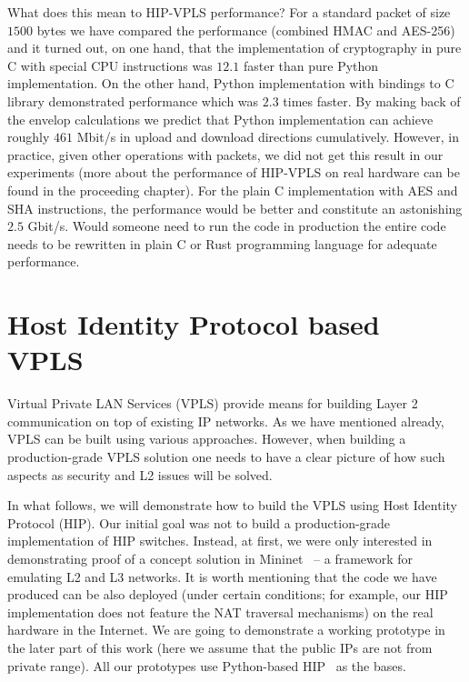What does this mean to HIP-VPLS performance? For a standard packet of size $1500$ 
bytes we have compared the performance (combined HMAC and AES-256) and it turned 
out, on one hand, that the implementation of cryptography in pure C with special CPU instructions was 
$12.1$ faster than pure Python implementation. On the other hand, Python implementation with bindings
to C library demonstrated performance which was $2.3$ times faster. By making back of the envelop calculations
we predict that Python implementation can achieve roughly $461$ Mbit/s in upload and download directions
cumulatively. However, in practice, given other operations with packets, we did not get this result 
in our experiments (more about the performance of HIP-VPLS on real hardware can be found in the proceeding 
chapter). For the plain C implementation with AES and SHA instructions, the performance would be 
better and constitute an astonishing $2.5$ Gbit/s. Would someone need to run the code in production
the entire code needs to be rewritten in plain C or Rust programming language for adequate performance.

\section{Host Identity Protocol based VPLS}

Virtual Private LAN Services (VPLS) provide means for building Layer 2 communication 
on top of existing IP networks. As we have mentioned already, VPLS can be built using various approaches. However, 
when building a production-grade VPLS solution one needs to have a clear picture of 
how such aspects as security and L2 issues will be solved.

In what follows, we will demonstrate how to build the VPLS using Host Identity Protocol (HIP). 
Our initial goal was not to build a production-grade implementation of HIP switches. Instead, 
at first, we were only interested in demonstrating proof of a concept solution in 
Mininet~\cite{mininet} – a framework for emulating L2 and L3 networks. It is worth mentioning that the code 
we have produced can be also deployed (under certain conditions; for example, our HIP implementation 
does not feature the NAT traversal mechanisms) on the real hardware in the Internet. We are going to demonstrate 
a working prototype in the later part of this work (here we assume that the public IPs are not from private 
range). All our prototypes use Python-based HIP~\cite{pyhip} as the bases.

